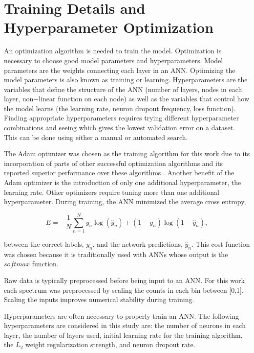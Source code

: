 \documentclass[tocnosub,noragright,centerchapter,12pt,fullpage]{uiucecethesis09}
\begin{document}
\section{Training Details and Hyperparameter Optimization}

An optimization algorithm is needed to train the model. Optimization is necessary to choose good model parameters and hyperparameters. Model parameters are the weights connecting each layer in an ANN. Optimizing the model parameters is also known as training or learning. Hyperparameters are the variables that define the structure of the ANN (number of layers, nodes in each layer, non$-$linear function on each node) as well as the variables that control how the model learns (the learning rate, neuron dropout frequency, loss function). Finding appropriate hyperparameters requires trying different hyperparameter combinations and seeing which gives the lowest validation error on a dataset. This can be done using either a manual or automated search.

The Adam optimizer was chosen as the training algorithm for this work due to its incorporation of parts of other successful optimization algorithms and its reported superior performance over these algorithms \cite{Kingma2015}. Another benefit of the Adam optimizer is the introduction of only one additional hyperparameter, the learning rate. Other optimizers require tuning more than one additional hyperparameter. During training, the ANN minimized the average cross entropy,

\begin{equation} \label{eq:CrossEntropy}
E = -{\frac{1} N} \sum_{n=1}^N y_n \log(\hat{y}_n) +  (1-y_n) \log(1-\hat{y}_n),
\end{equation}

between the correct labels, $y_n$, and the network predictions, $\hat{y}_n$. This cost function was chosen because it is traditionally used with ANNs whose output is the $softmax$ function. 

Raw data is typically preprocessed before being input to an ANN. For this work each spectrum was preprocessed by scaling the counts in each bin between [0,1]. Scaling the inputs improves numerical stability during training. 

Hyperparameters are often necessary to properly train an ANN. The following hyperparameters are considered in this study are: the number of neurons in each layer, the number of layers used, initial learning rate for the training algorithm, the $L_2$ weight regularization strength, and neuron dropout rate. 
\end{document}
